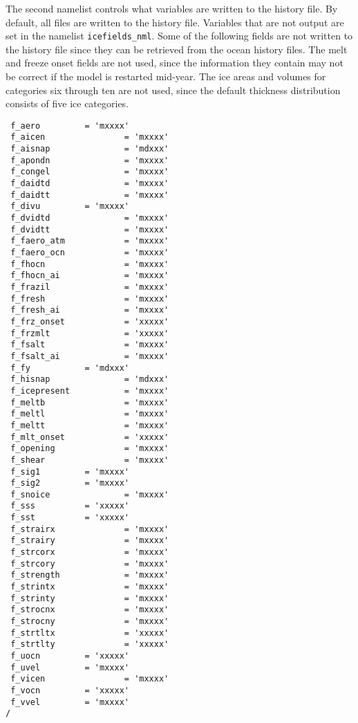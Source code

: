 The second namelist controls what variables are written to the history file.
By default, all files are written to the history file.  Variables that
are not output are set in the namelist {\tt icefields\_nml}.
Some of the following fields are not written to the history file since
they can be retrieved from the ocean history files.  The melt and freeze
onset fields are not used, since the information they contain may not
be correct if the model is restarted mid-year.  The ice areas and volumes
for categories six through ten are not used, since the default thickness
distribution consists of five ice categories.

\begin{verbatim}
 f_aero         = 'mxxxx' 
 f_aicen                = 'mxxxx' 
 f_aisnap               = 'mdxxx'
 f_apondn               = 'mxxxx' 
 f_congel               = 'mxxxx' 
 f_daidtd               = 'mxxxx' 
 f_daidtt               = 'mxxxx' 
 f_divu         = 'mxxxx' 
 f_dvidtd               = 'mxxxx' 
 f_dvidtt               = 'mxxxx' 
 f_faero_atm            = 'mxxxx' 
 f_faero_ocn            = 'mxxxx' 
 f_fhocn                = 'mxxxx' 
 f_fhocn_ai             = 'mxxxx' 
 f_frazil               = 'mxxxx' 
 f_fresh                = 'mxxxx' 
 f_fresh_ai             = 'mxxxx' 
 f_frz_onset            = 'xxxxx'
 f_frzmlt               = 'xxxxx'
 f_fsalt                = 'mxxxx' 
 f_fsalt_ai             = 'mxxxx' 
 f_fy           = 'mdxxx'
 f_hisnap               = 'mdxxx'
 f_icepresent           = 'mxxxx'
 f_meltb                = 'mxxxx' 
 f_meltl                = 'mxxxx' 
 f_meltt                = 'mxxxx' 
 f_mlt_onset            = 'xxxxx'
 f_opening              = 'mxxxx' 
 f_shear                = 'mxxxx' 
 f_sig1         = 'mxxxx' 
 f_sig2         = 'mxxxx' 
 f_snoice               = 'mxxxx' 
 f_sss          = 'xxxxx'
 f_sst          = 'xxxxx'
 f_strairx              = 'mxxxx' 
 f_strairy              = 'mxxxx' 
 f_strcorx              = 'mxxxx' 
 f_strcory              = 'mxxxx' 
 f_strength             = 'mxxxx' 
 f_strintx              = 'mxxxx' 
 f_strinty              = 'mxxxx' 
 f_strocnx              = 'mxxxx' 
 f_strocny              = 'mxxxx' 
 f_strtltx              = 'xxxxx'
 f_strtlty              = 'xxxxx'
 f_uocn         = 'xxxxx'
 f_uvel         = 'mxxxx' 
 f_vicen                = 'mxxxx' 
 f_vocn         = 'xxxxx'
 f_vvel         = 'mxxxx' 
/
\end{verbatim}
